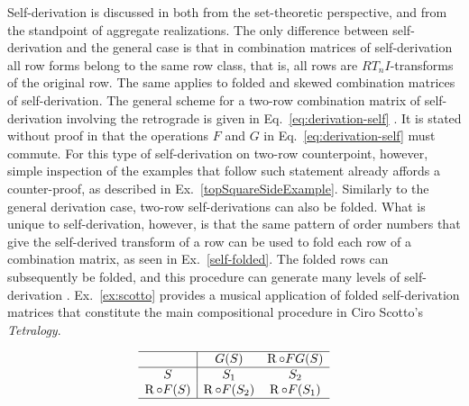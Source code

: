 Self-derivation is discussed in \cite[217, 226]{Starr1984} both from the set-theoretic perspective, and from the standpoint of aggregate realizations. The only difference between self-derivation and the general case is that in combination matrices of self-derivation all row forms belong to the same row class, that is, all rows are $RT_nI$-transforms of the original row. The same applies to folded and skewed combination matrices of self-derivation. The general scheme for a two-row combination matrix of self-derivation involving the retrograde is given in Eq.~\ref{eq:derivation-self} \cite[219]{Starr1984}. It is stated without proof in \cite[217]{Starr1984} that the operations $F$ and $G$ in Eq.~\ref{eq:derivation-self} must commute. For this type of self-derivation on two-row counterpoint, however, simple inspection of the examples that follow such statement already affords a counter-proof, as described in Ex.~\ref{topSquareSideExample}. Similarly to the general derivation case, two-row self-derivations can also be folded. What is unique to self-derivation, however, is that the same pattern of order numbers that give the self-derived transform of a row can be used to fold each row of a combination matrix, as seen in Ex.~\ref{self-folded}. The folded rows can subsequently be folded, and this procedure can generate many levels of self-derivation \cite[221]{Starr1984}. Ex.~\ref{ex:scotto} provides a musical application of folded self-derivation matrices that constitute the main compositional procedure in Ciro Scotto's \emph{Tetralogy}.

\begin{equation}
\begin{array}{c|cc}
	\hline
    & G(S) & \operatorname{R} \circ FG(S) \\
    \hline
    S & S_1 & S_2 \\
    \operatorname{R} \circ F(S) & \operatorname{R} \circ F(S_2) & \operatorname{R} \circ F(S_1) \\
    \hline
\end{array}
\label{eq:derivation-self}
\end{equation}

\vspace{12pt}

